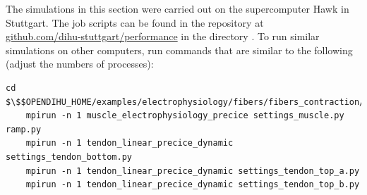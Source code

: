 \begin{reproduce_no_break}
  The simulations in this section were carried out on the supercomputer Hawk in Stuttgart. The job scripts can be found in the repository at \\ \href{https://github.com/dihu-stuttgart/performance}{github.com/dihu-stuttgart/performance} in the directory . To run similar simulations on other computers, run commands that are similar to the following (adjust the numbers of processes):
  \begin{lstlisting}[columns=fullflexible,breaklines=true,postbreak=\mbox{\textcolor{gray}{$\hookrightarrow$}\space}]
    cd $\$$OPENDIHU_HOME/examples/electrophysiology/fibers/fibers_contraction/with_tendons_precice/multiple_tendons_with_electrophysiology
    mpirun -n 1 muscle_electrophysiology_precice settings_muscle.py ramp.py
    mpirun -n 1 tendon_linear_precice_dynamic settings_tendon_bottom.py
    mpirun -n 1 tendon_linear_precice_dynamic settings_tendon_top_a.py
    mpirun -n 1 tendon_linear_precice_dynamic settings_tendon_top_b.py
  \end{lstlisting}
\end{reproduce_no_break}

